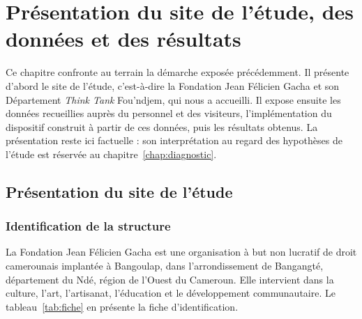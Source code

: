 %
\chapter{Présentation du site de l'étude, des données et des résultats}
\label{chap:terrain}

\introchap

Ce chapitre confronte au terrain la démarche exposée précédemment. Il présente
d'abord le site de l'étude, c'est-à-dire la Fondation Jean Félicien Gacha et
son Département \emph{Think Tank} Fou'ndjem, qui nous a accueilli. Il expose
ensuite les données recueillies auprès du personnel et des visiteurs,
l'implémentation du dispositif construit à partir de ces données, puis les
résultats obtenus. La présentation reste ici factuelle : son interprétation au
regard des hypothèses de l'étude est réservée au chapitre~\ref{chap:diagnostic}.

\section{Présentation du site de l'étude}
\label{sec:site}

\subsection{Identification de la structure}

La Fondation Jean Félicien Gacha est une organisation à but non lucratif de
droit camerounais implantée à Bangoulap, dans l'arrondissement de Bangangté,
département du Ndé, région de l'Ouest du Cameroun. Elle intervient dans la
culture, l'art, l'artisanat, l'éducation et le développement communautaire. Le
tableau~\ref{tab:fiche} en présente la fiche d'identification.

